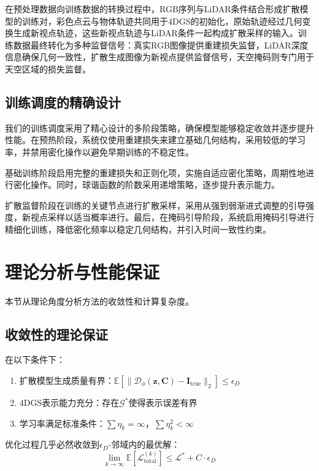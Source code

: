在预处理数据向训练数据的转换过程中，RGB序列与LiDAR条件结合形成扩散模型的训练对，彩色点云与物体轨迹共同用于4DGS的初始化，原始轨迹经过几何变换生成新视点轨迹，这些新视点轨迹与LiDAR条件一起构成扩散采样的输入。训练数据最终转化为多种监督信号：真实RGB图像提供重建损失监督，LiDAR深度信息确保几何一致性，扩散生成图像为新视点提供监督信号，天空掩码则专门用于天空区域的损失监督。

\subsection{训练调度的精确设计}

我们的训练调度采用了精心设计的多阶段策略，确保模型能够稳定收敛并逐步提升性能。在预热阶段，系统仅使用重建损失来建立基础几何结构，采用较低的学习率，并禁用密化操作以避免早期训练的不稳定性。

基础训练阶段启用完整的重建损失和正则化项，实施自适应密化策略，周期性地进行密化操作。同时，球谐函数的阶数采用递增策略，逐步提升表示能力。

扩散监督阶段在训练的关键节点进行扩散采样，采用从强到弱渐进式调整的引导强度，新视点采样以适当概率进行。最后，在掩码引导阶段，系统启用掩码引导进行精细化训练，降低密化频率以稳定几何结构，并引入时间一致性约束。

\section{理论分析与性能保证}

本节从理论角度分析方法的收敛性和计算复杂度。

\subsection{收敛性的理论保证}

\begin{theorem}[多模态损失收敛性]
在以下条件下：
\begin{enumerate}
\item 扩散模型生成质量有界：$\mathbb{E}[\|\mathcal{D}_\phi(\mathbf{z}, \mathbf{C}) - \mathbf{I}_{\text{true}}\|_2] \leq \epsilon_D$
\item 4DGS表示能力充分：存在$\mathcal{G}^*$使得表示误差有界
\item 学习率满足标准条件：$\sum \eta_k = \infty$，$\sum \eta_k^2 < \infty$
\end{enumerate}
优化过程几乎必然收敛到$\epsilon_D$-邻域内的最优解：
\begin{equation}
\lim_{k \to \infty} \mathbb{E}[\mathcal{L}_{\text{total}}^{(k)}] \leq \mathcal{L}^* + C \cdot \epsilon_D
\end{equation}
\end{theorem}

